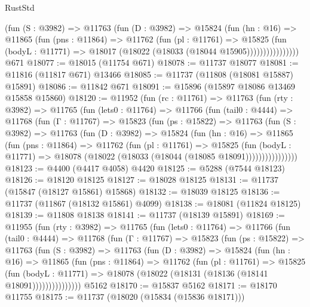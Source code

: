 \begin{lexlean}{RustStd}
\begin{coremodule}
                  (fun (S : @3982) =>
                  @11763
                    (fun (D : @3982) =>
                    @15824
                      (fun (hn : @16) =>
                      @11865
                        (fun (pns : @11864) =>
                        @11762
                          (fun (pl : @11761) =>
                          @15825
                            (fun (bodyL : @11771) =>
                            @18017 (@18022 (@18033 (@18044 @15905))))))))))))))))
    @671
@18077 := @18015 (@11754 @671)
@18078 := @11737 @18077
@18081 := @11816 (@11817 @671) @13466
@18085 := @11737 (@11808 (@18081 @15887) @15891)
@18086 := @11842 @671
@18091 := @15896 (@15897 @18086 @13469 @15858 @15860)
@18120 := @11952
    (fun (rc : @11761) =>
    @11763
      (fun (rty : @3982) =>
      @11765
        (fun (lets0 : @11764) =>
        @11766
          (fun (tail0 : @4444) =>
          @11768
            (fun (Γ : @11767) =>
            @15823
              (fun (ps : @15822) =>
              @11763
                (fun (S : @3982) =>
                @11763
                  (fun (D : @3982) =>
                  @15824
                    (fun (hn : @16) =>
                    @11865
                      (fun (pns : @11864) =>
                      @11762
                        (fun (pl : @11761) =>
                        @15825
                          (fun (bodyL : @11771) =>
                          @18078 (@18022 (@18033 (@18044 (@18085 @18091))))))))))))))))
@18123 := @4400 (@4417 @4058) @4420
@18125 := @5288 (@7544 @18123)
@18126 := @18120 @18125
@18127 := @18028 @18125
@18131 := @11737 (@15847 (@18127 @15861) @15868)
@18132 := @18039 @18125
@18136 := @11737 (@11867 (@18132 @15861) @4099)
@18138 := @18081 (@11824 @18125)
@18139 := @11808 @18138
@18141 := @11737 (@18139 @15891)
@18169 := @11955
    (fun (rty : @3982) =>
    @11765
      (fun (lets0 : @11764) =>
      @11766
        (fun (tail0 : @4444) =>
        @11768
          (fun (Γ : @11767) =>
          @15823
            (fun (ps : @15822) =>
            @11763
              (fun (S : @3982) =>
              @11763
                (fun (D : @3982) =>
                @15824
                  (fun (hn : @16) =>
                  @11865
                    (fun (pns : @11864) =>
                    @11762
                      (fun (pl : @11761) =>
                      @15825
                        (fun (bodyL : @11771) =>
                        @18078 (@18022 (@18131 (@18136 (@18141 @18091)))))))))))))))
    @5162
@18170 := @15837 @5162
@18171 := @18170 @11755
@18175 := @11737 (@18020 (@15834 (@15836 @18171)))

\end{coremodule}
\end{lexlean}

